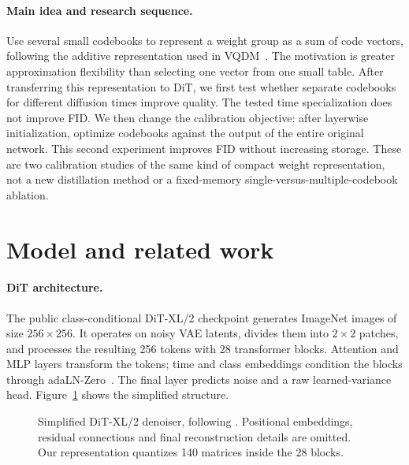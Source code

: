 \documentclass{article}
\begin{document}
\paragraph{Main idea and research sequence.}
Use several small codebooks to represent a weight group as a sum of code vectors, following the additive representation used in VQDM~\citep{egiazarian2024vqdm}. The motivation is greater approximation flexibility than selecting one vector from one small table. After transferring this representation to DiT, we first test whether separate codebooks for different diffusion times improve quality. The tested time specialization does not improve FID. We then change the calibration objective: after layerwise initialization, optimize codebooks against the output of the entire original network. This second experiment improves FID without increasing storage. These are two calibration studies of the same kind of compact weight representation, not a new distillation method or a fixed-memory single-versus-multiple-codebook ablation.

\section{Model and related work}
\paragraph{DiT architecture.}
The public class-conditional DiT-XL/2 checkpoint generates ImageNet images of size $256\times256$. It operates on noisy VAE latents, divides them into $2\times2$ patches, and processes the resulting 256 tokens with 28 transformer blocks. Attention and MLP layers transform the tokens; time and class embeddings condition the blocks through adaLN-Zero~\citep{peebles2023dit}. The final layer predicts noise and a raw learned-variance head. Figure~\ref{fig:dit} shows the simplified structure.

\begin{figure}[ht]
\centering
{}
\caption{Simplified DiT-XL/2 denoiser, following \citet{peebles2023dit}. Positional embeddings, residual connections and final reconstruction details are omitted. Our representation quantizes 140 matrices inside the 28 blocks.}
\label{fig:dit}
\end{figure}
\end{document}
